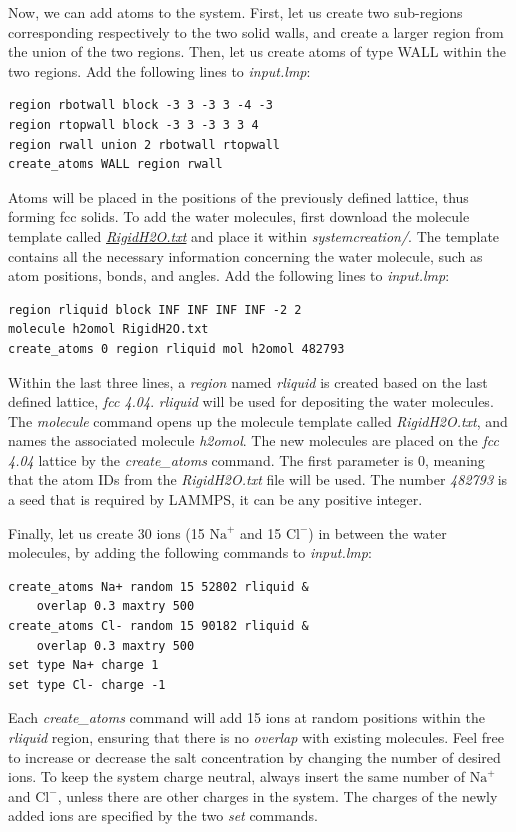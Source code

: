 \documentclass[9pt,tutorial]{livecoms}
\begin{document}
Now, we can add atoms to the system. First, let us create two sub-regions corresponding
respectively to the two solid walls, and create a larger region from the union of the
two regions. Then, let us create atoms of type WALL within the two regions. Add the
following lines to \textit{input.lmp}:
\begin{lstlisting}
region rbotwall block -3 3 -3 3 -4 -3
region rtopwall block -3 3 -3 3 3 4
region rwall union 2 rbotwall rtopwall
create_atoms WALL region rwall
\end{lstlisting}
Atoms will be placed in the positions of the previously defined lattice, thus
forming fcc solids. To add the water molecules, first download the molecule
template called \href{https://raw.githubusercontent.com/lammpstutorials/lammpstutorials-article/main/files/tutorial4/RigidH2O.txt}{\textit{RigidH2O.txt}}
and place it within \textit{systemcreation/}. The template contains all the
necessary information concerning the water molecule, such as atom positions,
bonds, and angles. Add the following lines to \textit{input.lmp}:
\begin{lstlisting}
region rliquid block INF INF INF INF -2 2
molecule h2omol RigidH2O.txt
create_atoms 0 region rliquid mol h2omol 482793
\end{lstlisting}
Within the last three lines, a \textit{region} named \textit{rliquid} is
created based on the last defined lattice, \textit{fcc 4.04}. \textit{rliquid}
will be used for depositing the water molecules. The \textit{molecule} command
opens up the molecule template called \textit{RigidH2O.txt}, and names the
associated molecule \textit{h2omol}. The new molecules are placed on the
\textit{fcc 4.04} lattice by the \textit{create\_atoms} command. The first
parameter is 0, meaning that the atom IDs from the \textit{RigidH2O.txt} file
will be used. The number \textit{482793} is a seed that is required by LAMMPS,
it can be any positive integer.

Finally, let us create 30 ions (15 $\text{Na}^+$ and 15 $\text{Cl}^-$) in between
the water molecules, by adding the following commands to \textit{input.lmp}:
\begin{lstlisting}
create_atoms Na+ random 15 52802 rliquid &
    overlap 0.3 maxtry 500
create_atoms Cl- random 15 90182 rliquid &
    overlap 0.3 maxtry 500
set type Na+ charge 1
set type Cl- charge -1
\end{lstlisting}
Each \textit{create\_atoms} command will add 15 ions at random positions
within the \textit{rliquid} region, ensuring that there is no \textit{overlap}
with existing molecules. Feel free to increase or decrease the salt concentration
by changing the number of desired ions. To keep the system charge neutral,
always insert the same number of $\text{Na}^+$ and $\text{Cl}^-$, unless there
are other charges in the system. The charges of the newly added ions are specified
by the two \textit{set} commands.
\end{document}
